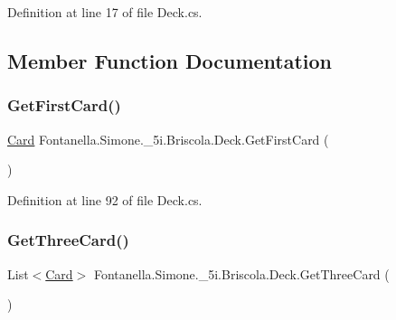 Definition at line 17 of file Deck.\+cs.



\subsection{Member Function Documentation}
\hypertarget{class_fontanella_1_1_simone_1_1__5i_1_1_briscola_1_1_deck_a12d623abbe81c4a10a6e52a82a426591}{}\label{class_fontanella_1_1_simone_1_1__5i_1_1_briscola_1_1_deck_a12d623abbe81c4a10a6e52a82a426591} 
\subsubsection{\texorpdfstring{Get\+First\+Card()}{GetFirstCard()}}
{\footnotesize\ttfamily \hyperlink{class_fontanella_1_1_simone_1_1__5i_1_1_briscola_1_1_card}{Card} Fontanella.\+Simone.\+\_\+5i.\+Briscola.\+Deck.\+Get\+First\+Card (\begin{DoxyParamCaption}{ }\end{DoxyParamCaption})}



Definition at line 92 of file Deck.\+cs.

\hypertarget{class_fontanella_1_1_simone_1_1__5i_1_1_briscola_1_1_deck_a6f7eeeefb6eb39856f371d3472ab68a6}{}\label{class_fontanella_1_1_simone_1_1__5i_1_1_briscola_1_1_deck_a6f7eeeefb6eb39856f371d3472ab68a6} 
\subsubsection{\texorpdfstring{Get\+Three\+Card()}{GetThreeCard()}}
{\footnotesize\ttfamily List$<$\hyperlink{class_fontanella_1_1_simone_1_1__5i_1_1_briscola_1_1_card}{Card}$>$ Fontanella.\+Simone.\+\_\+5i.\+Briscola.\+Deck.\+Get\+Three\+Card (\begin{DoxyParamCaption}{ }\end{DoxyParamCaption})}



